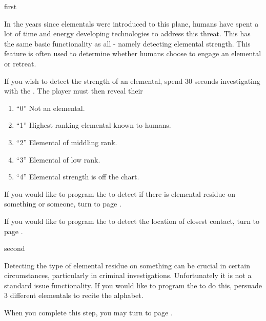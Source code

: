 \documentclass[notebook]{elementals}
\begin{document}
\startnotebook{\nTricorder{}}

\begin{page}{first}

In the years since elementals were introduced to this plane, humans have spent a lot of time and energy developing technologies to address this threat. This \iTricorder{} has the same basic functionality as all \iTricorder{} - namely detecting elemental strength. This feature is often used to determine whether humans choose to engage an elemental or retreat.

If you wish to detect the strength of an elemental, spend 30 seconds investigating with the \iTricorder{}. The player must then reveal their %
\begin{enumerate}
  \item ``0'' Not an elemental.
  \item ``1'' Highest ranking elemental known to humans.
  \item ``2'' Elemental of middling rank.
  \item ``3'' Elemental of low rank.
  \item ``4'' Elemental strength is off the chart.

\end{enumerate}

If you would like to program the \iTricorder{} to detect if there is elemental residue on something or someone, turn to page .

If you would like to program the \iTricorder{} to detect the location of closest contact, turn to page .

\end{page}

\begin{page}{second}

Detecting the type of elemental residue on something can be crucial in certain circumstances, particularly in criminal investigations. Unfortunately it is not a standard issue functionality. If you would like to program the \iTricorder{} to do this, persuade 3 different elementals to recite the alphabet.

When you complete this step, you may turn to page .

\end{page}
\end{document}
